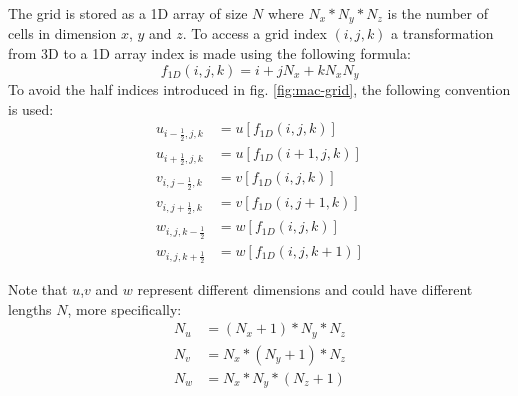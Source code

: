 The grid is stored as a 1D array of size \begin{math}N\end{math} where \begin{math}N_x*N_y*N_z\end{math} is the number of cells in dimension \begin{math}x\end{math}, \begin{math}y\end{math} and \begin{math}z\end{math}. To access a grid index \begin{math}(i,j,k)\end{math} a transformation from 3D to a 1D array index is made using the following formula:
 \begin{equation} 
 f_{1D}(i,j,k) = i + jN_x + kN_xN_y 
 \end{equation}
To avoid the half indices introduced in fig. \ref{fig:mac-grid}, the following convention is used:  
\begin{align*}
 u_{i-\frac{1}{2},j,k} & =  u[f_{1D}(i,j,k)] 			\\
 u_{i+\frac{1}{2},j,k} & =  u[f_{1D}(i+1,j,k)] 			\\
 v_{i,j-\frac{1}{2},k} & =  v[f_{1D}(i,j,k)] 			\\
 v_{i,j+\frac{1}{2},k} & =  v[f_{1D}(i,j+1,k)] 			\\
 w_{i,j,k-\frac{1}{2}} & =  w[f_{1D}(i,j,k)] 			\\
 w_{i,j,k+\frac{1}{2}} & =  w[f_{1D}(i,j,k+1)] 		
 \end{align*}

Note that $u$,$v$ and $w$ represent different dimensions and could have different lengths $N$, more specifically:
 \begin{align*}
N_u & = (N_x+1)*N_y*N_z			\\
N_v & = N_x*(N_y+1)*N_z			\\
N_w & = N_x*N_y*(N_z+1)				
 \end{align*}
